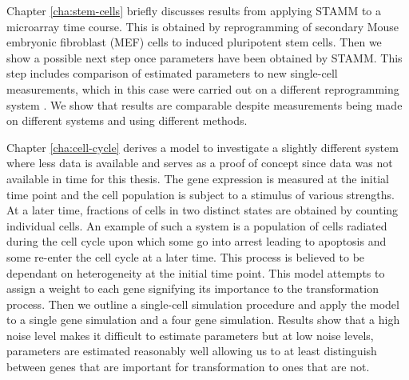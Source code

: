 Chapter \ref{cha:stem-cells} briefly discusses results from applying STAMM to a microarray time course. This is obtained by  reprogramming of secondary Mouse embryonic fibroblast (MEF) cells to induced pluripotent stem cells. Then we show a possible next step once parameters have been obtained by STAMM. This step includes comparison of estimated parameters to new single-cell measurements, which in this case were carried out on a different reprogramming system \citep{Buganim:2012hp}. We show that results are comparable despite measurements being made on different systems and using different methods.

Chapter \ref{cha:cell-cycle} derives a model to investigate a slightly different system where less data is available and serves as a proof of concept since data was not available in time for this thesis. The gene expression is measured at the initial time point and the cell population is subject to a stimulus of various strengths. At a later time, fractions of cells in two distinct states are obtained by counting individual cells. An example of such a system is a population of cells radiated during the cell cycle upon which some go into arrest leading to apoptosis and some re-enter the cell cycle at a later time. This process is believed to be dependant on heterogeneity at the initial time point. This model attempts to assign a weight to each gene signifying its importance to the transformation process. Then we outline a single-cell simulation procedure and apply the model to a single gene simulation and a four gene simulation. Results show that a high noise level makes it difficult to estimate parameters but at low noise levels, parameters are estimated reasonably well allowing us to at least distinguish between genes that are important for transformation to ones that are not.

